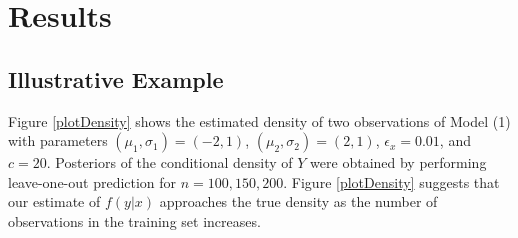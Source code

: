 \documentclass{article} %
\providecommand{\mc}[1]{\mathcal{#1}}
\begin{document}




\section{Results}

\subsection{Illustrative Example}


Figure \ref{plotDensity} shows the estimated density of two observations of Model (1) with parameters $(\mu_1,\sigma_1)=(-2,1)$, $(\mu_2,\sigma_2)=(2,1)$, $\epsilon_x=0.01$, and $c=20$. Posteriors of the conditional density of $Y$  were obtained by performing leave-one-out prediction for  $n=100, 150, 200$. Figure \ref{plotDensity} suggests that our estimate of $f(y|x)$ approaches the true density as the number of observations in the training set increases.
\end{document}
